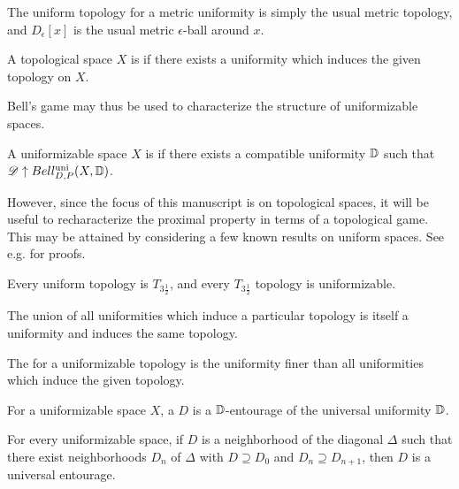 The uniform topology for a metric uniformity is simply the usual metric
topology, and $D_\epsilon[x]$ is the usual metric $\epsilon$-ball around $x$.

\begin{defn}
  A topological space $X$ is  if there exists
  a uniformity which induces the given topology on $X$.
\end{defn}

Bell's game may thus be used to characterize the structure of uniformizable
spaces.

\begin{defn}
  A uniformizable space $X$ is  if there exists a compatible
  uniformity $\mathbb{D}$ such that $\mathscr{D}\uparrow Bell_{D,P}^{\textrm{uni}}(X,\mathbb{D})$.
\end{defn}

However, since the focus of this manuscript is on topological spaces,
it will be useful to recharacterize the proximal property in terms of a
topological game. This may be attained by considering a few known results on
uniform spaces. See e.g. \cite{MR2048350} for proofs.

\begin{thm}
  Every uniform topology is $T_{3\frac{1}{2}}$, and
  every $T_{3\frac{1}{2}}$ topology is uniformizable.
\end{thm}

\begin{thm}
  The union of all uniformities which induce a particular topology is itself
  a uniformity and induces the same topology.
\end{thm}

\begin{defn}
  The  for a uniformizable topology is the uniformity
  finer than all uniformities which induce the given topology.
\end{defn}

\begin{defn}
  For a uniformizable space $X$, a  $D$ is a
  $\mathbb{D}$-entourage of the universal uniformity $\mathbb{D}$.
\end{defn}

\begin{thm}
  For every uniformizable space, if $D$ is a neighborhood of the diagonal
  $\Delta$  such that there exist neighborhoods $D_n$ of $\Delta$ with
  $D\supseteq D_0$ and $D_n \supseteq D_{n+1}$, then $D$ is a universal
  entourage.
\end{thm}

